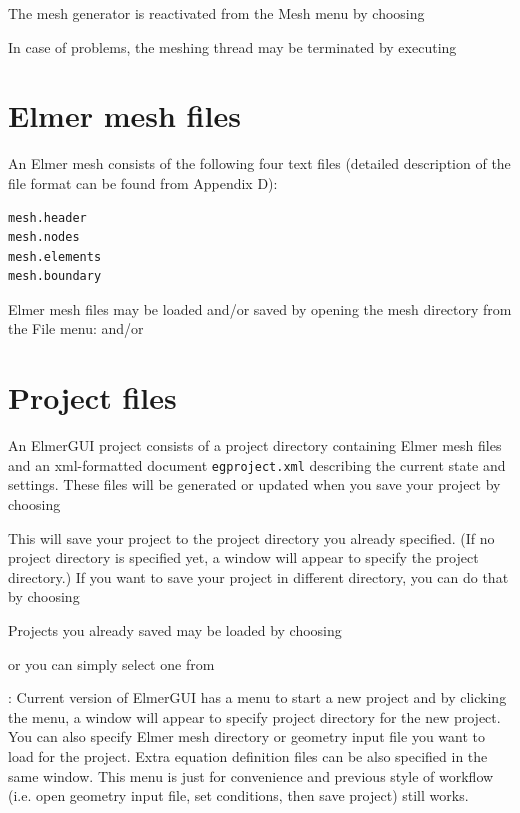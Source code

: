 The mesh generator is reactivated from the Mesh menu by choosing

\noindent In case of problems, the meshing thread may be terminated by executing 

\section{Elmer mesh files}

An Elmer mesh consists of the following four text files (detailed description of the file
format can be found from Appendix D):

\begin{footnotesize}
\begin{verbatim}
mesh.header 
mesh.nodes 
mesh.elements 
mesh.boundary 
\end{verbatim}
\end{footnotesize}

Elmer mesh files may be loaded and/or saved by opening the mesh directory from the File menu:
\noindent and/or

\section{Project files}

An ElmerGUI project consists of a project directory containing Elmer mesh files and an xml-formatted 
document {\tt egproject.xml} describing the current state and settings. These files will be generated or updated when you save your project by choosing


This will save your project to the project directory you already specified. (If no project directory is specified yet, a window will appear to specify the project directory.) If you want to save your project in different directory, you can do that by choosing


\noindent Projects you already saved may be loaded by choosing


\noindent or you can simply select one from

\vspace{3mm}
: Current version of ElmerGUI has a menu to start a new project 
 \noindent and by clicking the menu, a window will appear to specify project directory for the new project. You can also specify Elmer mesh directory or geometry input file you want to load for the project. Extra equation definition files can be also specified in the same window. This menu is just for convenience and previous style of workflow (i.e. open geometry input file, set conditions, then save project) still works.

